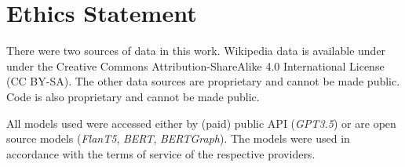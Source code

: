 \section*{Ethics Statement}

There were two sources of data in this work. Wikipedia data is available under under the Creative
Commons Attribution-ShareAlike 4.0 International License (CC BY-SA). The other data sources are proprietary and cannot be made public. Code is also proprietary and cannot be made public.

All models used were accessed either by (paid) public API (\emph{GPT3.5}) or are open source models (\emph{FlanT5}, \emph{BERT}, \emph{BERTGraph}). The models were used in accordance with the terms of service of the respective providers.